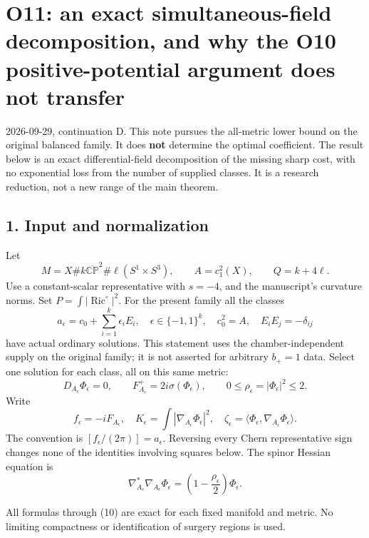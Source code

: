 \documentclass[
]{article}
\author{}
\date{}
\begin{document}
\hypertarget{o11-an-exact-simultaneous-field-decomposition-and-why-the-o10-positive-potential-argument-does-not-transfer}{%
\section{O11: an exact simultaneous-field decomposition, and why the O10
positive-potential argument does not
transfer}\label{o11-an-exact-simultaneous-field-decomposition-and-why-the-o10-positive-potential-argument-does-not-transfer}}

2026-09-29, continuation D. This note pursues the all-metric lower bound
on the original balanced family. It does \textbf{not} determine the
optimal coefficient. The result below is an exact differential-field
decomposition of the missing sharp cost, with no exponential loss from
the number of supplied classes. It is a research reduction, not a new
range of the main theorem.

\hypertarget{input-and-normalization}{%
\subsection{1. Input and normalization}\label{input-and-normalization}}

Let \[
M=X\#k\overline{\mathbb {CP}}^2\#\ell(S^1\times S^3),
\qquad A=c_1^2(X),\qquad Q=k+4\ell.
\] Use a constant-scalar representative with \(s=-4\), and the
manuscript's curvature norms. Set
\(P=\int|\operatorname{Ric}^\circ|^2\). For the present family all the
classes \[
a_\epsilon=c_0+\sum_{i=1}^k\epsilon_iE_i,
\quad \epsilon\in\{-1,1\}^k,
\quad c_0^2=A,\quad E_iE_j=-\delta_{ij}
\] have actual ordinary solutions. This statement uses the
chamber-independent supply on the original family; it is not asserted
for arbitrary \(b_+=1\) data. Select one solution for each class, all on
this same metric: \[
D_{A_\epsilon}\Phi_\epsilon=0,
\qquad F_{A_\epsilon}^+=2i\sigma(\Phi_\epsilon),
\qquad 0\le\rho_\epsilon=|\Phi_\epsilon|^2\le2.
\] Write \[
f_\epsilon=-iF_{A_\epsilon},\quad
K_\epsilon=\int|\nabla_{A_\epsilon}\Phi_\epsilon|^2,
\quad\zeta_\epsilon=\langle\Phi_\epsilon,\nabla_{A_\epsilon}\Phi_\epsilon\rangle.
\] The convention is \([f_\epsilon/(2\pi)]=a_\epsilon\). Reversing every
Chern representative sign changes none of the identities involving
squares below. The spinor Hessian equation is \[
\nabla_{A_\epsilon}^*\nabla_{A_\epsilon}\Phi_\epsilon
=\left(1-\frac{\rho_\epsilon}{2}\right)\Phi_\epsilon.
\tag{1}
\]

All formulas through (10) are exact for each fixed manifold and metric.
No limiting compactness or identification of surgery regions is used.
\end{document}
